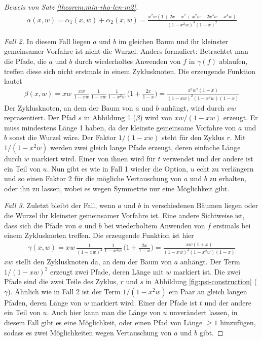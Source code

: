 \documentclass[a4paper, 11pt, ngerman]{article}
\begin{document}
\begin{proof}[Beweis von Satz \ref{theorem:min-rho-len-m2}]
    \begin{align*}
        \alpha(x, w)
        = \alpha_1(x, w) + \alpha_2(x, w)
        = \frac {x^2w(1 + 2x - x^2 + x^2w - 2x^3w - x^4w)}
        {(1 - x^2w)^3(1 - x)^2}
    \end{align*}

    \emph{Fall 2.}  In diesem Fall liegen $a$ und $b$ im gleichen Baum und ihr kleinster gemeinsamer Vorfahre ist nicht die Wurzel. Anders formuliert: Betrachtet man die Pfade, die $a$ und $b$ durch wiederholtes Anwenden von $f$ in $\gamma(f)$ ablaufen, treffen diese sich nicht erstmals in einem Zyklusknoten. Die erzeugende Funktion lautet
    \begin{align*}
        \beta(x, w)
        = xw \; \frac {xw} {1 - xw} \, \frac {1} {1 - xw} \,
        \frac {1} {1 - x^2w} \, \Bigg (1 + \frac {2x} {1 - x} \Bigg )
        = \frac {x^2w^2(1 + x)} {(1 - xw)^2(1 - x^2w)(1 - x)}
    \end{align*}
    Der Zyklusknoten, an dem der Baum von $a$ und $b$ anhängt, wird durch $xw$ repräsentiert. Der Pfad $s$ in Abbildung 1 ($\beta$) wird von  $xw/(1 - xw)$ erzeugt. Er muss mindestens Länge 1 haben, da der kleinste gemeinsame Vorfahre von $a$ und $b$ sonst die Wurzel wäre. Der Faktor $1/(1 - xw)$ steht für den Zyklus $r$. Mit $1/(1 - x^2w)$ werden zwei gleich lange Pfade erzeugt, deren einfache Länge durch $w$ markiert wird. Einer von ihnen wird für $t$ verwendet und der andere ist ein Teil von $u$. Nun gibt es wie in Fall 1 wieder die Option, $u$ echt zu verlängern und so einen Faktor 2 für die mögliche Vertauschung von $a$ und $b$ zu erhalten, oder ihn zu lassen, wobei es wegen Symmetrie nur eine Möglichkeit gibt.


    \emph{Fall 3.} Zuletzt bleibt der Fall, wenn $a$ und $b$ in verschiedenen Bäumen liegen oder die Wurzel ihr kleinster gemeinsamer Vorfahre ist. Eine andere Sichtweise ist, dass sich die Pfade von $a$ und $b$ bei wiederholtem Anwenden von $f$ erstmals bei einem Zyklusknoten treffen. Die erzeugende Funktion ist hier
    \begin{align*}
        \gamma(x, w)
        = xw \, \frac {1} {(1 - xw)^2} \, \frac {1} {1 - x^2w} \,
        \Bigg (1 + \frac {2x}{1 - x} \Bigg )
        = \frac {xw(1 + x)} {(1 - xw)^2(1 - x^2w)(1 - x)}
    \end{align*}
    $xw$ stellt den Zyklusknoten da, an dem der Baum von $a$ anhängt. Der Term $1/(1 - xw)^2$ erzeugt zwei Pfade, deren Länge mit $w$ markiert ist. Die zwei Pfade sind die zwei Teile des Zyklus, $r$ und $s$ in Abbildung \ref{fig:psi-construction} ($\gamma$). Ähnlich wie in Fall 2 ist der Term $1/(1 - x^2w)$ ein Paar an gleich langen Pfaden, deren Länge von $w$ markiert wird. Einer der Pfade ist $t$ und der andere ein Teil von $u$. Auch hier kann man die Länge von $u$ unverändert lassen, in diesem Fall gibt es eine Möglichkeit, oder einen Pfad von Länge $\ge 1$ hinzufügen, sodass es zwei Möglichkeiten wegen Vertauschung von $a$ und $b$ gibt.


\end{proof}
\end{document}
